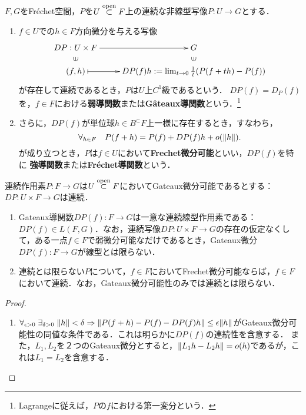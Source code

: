 \documentclass[uplatex,dvipdfmx]{jsreport}
\begin{document}
\begin{definition}
    $F,G$をFréchet空間，$P$を$U\overset{\mathrm{open}}{\subset} F$上の連続な非線型写像$P:U\to G$とする．
    \begin{enumerate}
        \item 
    $f\in U$での$h\in F$方向微分を与える写像
    \[\xymatrix@R-2pc{
        DP:U\times F\ar[r]&G\\
        \rotatebox[origin=c]{90}{$\in$}&\rotatebox[origin=c]{90}{$\in$}\\
        (f,h)\ar@{|->}[r]&DP(f)h:=\lim_{t\to0}\frac{1}{t}(P(f+th)-P(f))
    }\]
    が存在して連続であるとき，$P$は$U$上$C^1$級であるという．
    $DP(f)=D_P(f)$を，$f\in F$における\textbf{弱導関数}または\textbf{Gâteaux導関数}という．\footnote{Lagrangeに従えば，$P$の$f$における第一変分という．}
    \item さらに，$DP(f)$が単位球$h\in B^\subset F$上一様に存在するとき，すなわち，
    \[\forall_{h\in F}\quad P(f+h)=P(f)+DP(f)h+o(\|h\|).\]
    が成り立つとき，$P$は$f\in U$において\textbf{Frechet微分可能}といい，$DP(f)$を特に
    \textbf{強導関数}または\textbf{Fréchet導関数}という．
    \end{enumerate}
\end{definition}

\begin{lemma}
    連続作用素$P:F\to G$は$U\overset{\mathrm{open}}{\subset} F$においてGateaux微分可能であるとする：$DP:U\times F\to G$は連続．
    \begin{enumerate}
        \item Gateaux導関数$DP(f):F\to G$は一意な連続線型作用素である：$DP(f)\in L(F,G)$．なお，連続写像$DP:U\times F\to G$の存在の仮定なくして，ある一点$f\in F$で弱微分可能なだけであるとき，Gateaux微分$DP(f):F\to G$が線型とは限らない．
        \item 連続とは限らない$P$について，$f\in F$においてFrechet微分可能ならば，$f\in F$において連続．なお，Gateaux微分可能性のみでは連続とは限らない．
    \end{enumerate}
\end{lemma}
\begin{proof}\mbox{}
    \begin{enumerate}
        \item 
        $\forall_{\epsilon>0}\;\exists_{\delta>0}\;\|h\|<\delta\Rightarrow\|P(f+h)-P(f)-DP(f)h\|\le\epsilon\|h\|$がGateaux微分可能性の同値な条件である．これは明らかに$DP(f)$の連続性を含意する．
        また，$L_1,L_2$を２つのGateaux微分とすると，$\|L_1h-L_2h\|=o(h)$であるが，これは$L_1=L_2$を含意する．
    \end{enumerate}
\end{proof}
\end{document}
